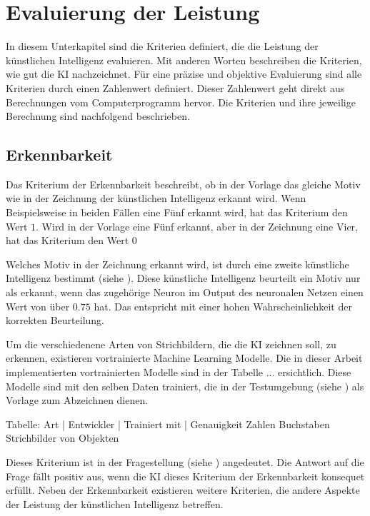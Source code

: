 \section{Evaluierung der Leistung}
\label{chap:m_eval}
In diesem Unterkapitel sind die Kriterien definiert, die die Leistung der
künstlichen Intelligenz evaluieren. Mit anderen Worten beschreiben die
Kriterien, wie gut die KI nachzeichnet. Für eine präzise und objektive
Evaluierung sind alle Kriterien durch einen Zahlenwert definiert. Dieser
Zahlenwert geht direkt aus Berechnungen vom Computerprogramm hervor. Die
Kriterien und ihre jeweilige Berechnung sind nachfolgend beschrieben.

\subsection{Erkennbarkeit}
\label{sub:m_eval_rec}
Das Kriterium der Erkennbarkeit beschreibt, ob in der Vorlage das gleiche Motiv
wie in der Zeichnung der künstlichen Intelligenz erkannt wird. Wenn
Beispielsweise in beiden Fällen eine Fünf erkannt wird, hat das Kriterium den
Wert $1$. Wird in der Vorlage eine Fünf erkannt, aber in der Zeichnung eine
Vier, hat das Kriterium den Wert $0$

Welches Motiv in der Zeichnung erkannt wird, ist durch eine zweite künstliche
Intelligenz bestimmt (siehe ). Diese künstliche
Intelligenz beurteilt ein Motiv nur als erkannt, wenn das zugehörige Neuron im
Output des neuronalen Netzen einen Wert von über $0.75$ hat. Das entspricht mit
einer hohen Wahrscheinlichkeit der korrekten Beurteilung.

Um die verschiedenene Arten von Strichbildern, die die KI zeichnen soll, zu
erkennen, existieren vortrainierte Machine Learning Modelle. Die in dieser
Arbeit implementierten vortrainierten Modelle sind in der Tabelle {...}
ersichtlich. Diese Modelle sind mit den selben Daten trainiert, die in der
Testumgebung (siehe ) als Vorlage zum Abzeichnen
dienen.

Tabelle:
Art       |       Entwickler      |     Trainiert mit     |      Genauigkeit 
Zahlen  
Buchstaben
Strichbilder von Objekten

Dieses Kriterium ist in der Fragestellung (siehe )
angedeutet. Die Antwort auf die Frage fällt positiv aus, wenn die KI dieses
Kriterium der Erkennbarkeit konsequet erfüllt. Neben der Erkennbarkeit
existieren weitere Kriterien, die andere Aspekte der Leistung der künstlichen
Intelligenz betreffen.

